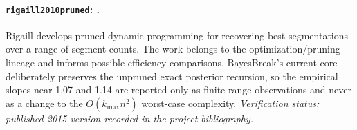 
\paragraph{\texttt{rigaill2010pruned}: \citet{rigaill2010pruned}.}
Rigaill develops pruned dynamic programming for recovering best segmentations over a range of segment counts. The work belongs to the optimization/pruning lineage and informs possible efficiency comparisons. BayesBreak's current core deliberately preserves the unpruned exact posterior recursion, so the empirical slopes near 1.07 and 1.14 are reported only as finite-range observations and never as a change to the $O(k_{\max}n^2)$ worst-case complexity. \textit{Verification status: published 2015 version recorded in the project bibliography.}
